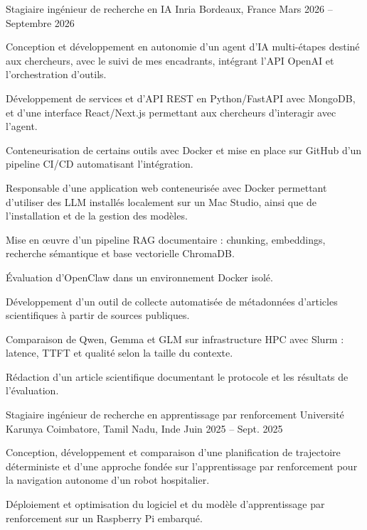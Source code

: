 
\begin{cventries}
  \cventry
    {Stagiaire ingénieur de recherche en IA}
    {Inria}
    {Bordeaux, France}
    {Mars 2026 -- Septembre 2026}
    {
      \begin{cvitems}
        \item {Conception et développement en autonomie d’un agent d’IA multi-étapes destiné aux chercheurs, avec le suivi de mes encadrants, intégrant l’API OpenAI et l’orchestration d’outils.}
        \item {Développement de services et d’API REST en Python/FastAPI avec MongoDB, et d’une interface React/Next.js permettant aux chercheurs d’interagir avec l’agent.}
        \item {Conteneurisation de certains outils avec Docker et mise en place sur GitHub d’un pipeline CI/CD automatisant l’intégration.}
        \item {Responsable d’une application web conteneurisée avec Docker permettant d’utiliser des LLM installés localement sur un Mac Studio, ainsi que de l’installation et de la gestion des modèles.}
        \item {Mise en œuvre d’un pipeline RAG documentaire : chunking, embeddings, recherche sémantique et base vectorielle ChromaDB.}
        \item {Évaluation d’OpenClaw dans un environnement Docker isolé.}
        \item {Développement d’un outil de collecte automatisée de métadonnées d’articles scientifiques à partir de sources publiques.}
        \item {Comparaison de Qwen, Gemma et GLM sur infrastructure HPC avec Slurm : latence, TTFT et qualité selon la taille du contexte.}
        \item {Rédaction d’un article scientifique documentant le protocole et les résultats de l’évaluation.}
      \end{cvitems}
    }

  \cventry
    {Stagiaire ingénieur de recherche en apprentissage par renforcement}
    {Université Karunya}
    {Coimbatore, Tamil Nadu, Inde}
    {Juin 2025 -- Sept. 2025}
    {
      \begin{cvitems}
        \item {Conception, développement et comparaison d’une planification de trajectoire déterministe et d’une approche fondée sur l’apprentissage par renforcement pour la navigation autonome d’un robot hospitalier.}
        \item {Déploiement et optimisation du logiciel et du modèle d’apprentissage par renforcement sur un Raspberry Pi embarqué.}
      \end{cvitems}
    }
\end{cventries}
